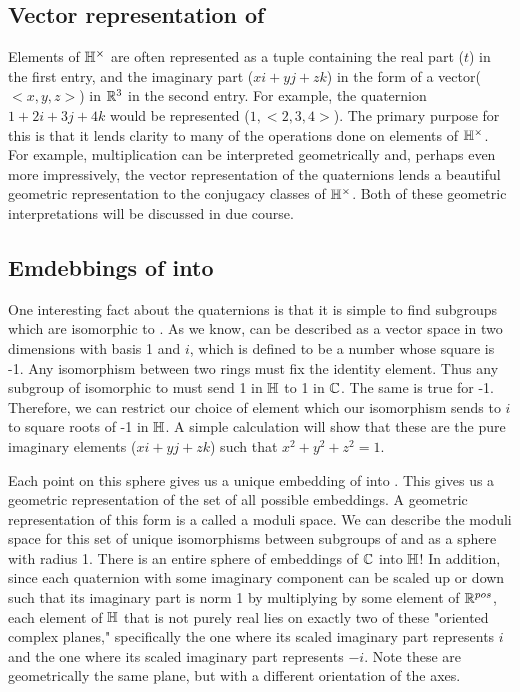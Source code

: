 \documentclass{article}
\begin{document}
\subsection{Vector representation of \bH}
Elements of $\protect\mathbb{H}^\times$ are often represented as a tuple containing the real part ($t$) in the first entry, and the imaginary part ($xi+yj+zk$) in the form of a vector($<x, y, z>$) in $\protect\mathbb{R}^3$ in the second entry. For example, the quaternion $1+2i+3j+4k$ would be represented ($1,<2,3,4>$). The primary purpose for this is that it lends clarity to many of the operations done on elements of $\protect\mathbb{H}^\times$. For example, multiplication can be interpreted geometrically and, perhaps even more impressively, the vector representation of the quaternions lends a beautiful geometric representation to the conjugacy classes of  $\protect\mathbb{H}^\times$. Both of these geometric interpretations will be discussed in due course.

\subsection{Emdebbings of \bC into \bH}
One interesting fact about the quaternions is that it is simple to find subgroups which are isomorphic to \bC. As we know, \bC can be described as a vector space in two dimensions with basis 1 and $i$, which is defined to be a number whose square is -1. Any isomorphism between two rings must fix the identity element. Thus any subgroup of \bH isomorphic to \bC must send 1 in $\protect\mathbb{H}$ to 1 in $\protect\mathbb{C}$. The same is true for -1. Therefore, we can restrict our choice of element which our isomorphism sends to $i$ to square roots of -1 in $\protect\mathbb{H}$. A simple calculation will show that these are the pure imaginary elements ($xi+yj+zk$) such that $x^2+y^2+z^2=1$. 

Each point on this sphere gives us a unique embedding of \bC into \bH. This gives us a geometric representation of the set of all possible embeddings. A geometric representation of this form is a called a moduli space. We can describe the moduli space for this set of unique isomorphisms between subgroups of \bC and \bH as a sphere with radius 1. There is an entire sphere of embeddings of $\protect\mathbb{C}$ into $\protect\mathbb{H}$! In addition, since each quaternion with some imaginary component can be scaled up or down such that its imaginary part is norm 1 by multiplying by some element of $\protect\mathbb{R}^{pos}$, each element of $\protect\mathbb{H}$ that is not purely real lies on exactly two of these "oriented complex planes," specifically the one where its scaled imaginary part represents $i$ and the one where its scaled imaginary part represents $-i$. Note these are geometrically the same plane, but with a different orientation of the axes. 
\end{document}
